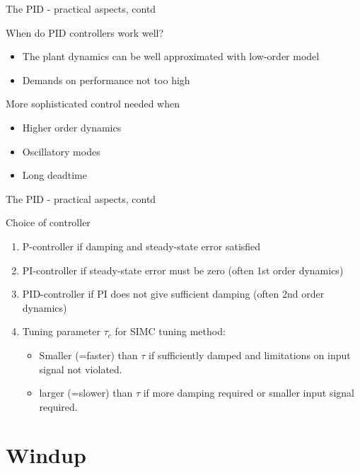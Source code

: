 \documentclass[presentation,aspectratio=169, usenames, dvipsnames]{beamer}
\begin{document}
\begin{frame}[label={sec:org348d7d8}]{The PID - practical aspects, contd}
\begin{block}{When do PID controllers work well?}
\begin{itemize}
\item The plant dynamics can be well approximated with low-order model
\item Demands on performance not too high
\end{itemize}
\end{block}
\begin{block}{More sophisticated control needed when}
\begin{itemize}
\item Higher order dynamics
\item Oscillatory modes
\item Long deadtime
\end{itemize}
\end{block}
\end{frame}

\begin{frame}[label={sec:org8734794}]{The PID - practical aspects, contd}
\begin{block}{Choice of controller}
\begin{enumerate}
\item P-controller if damping and steady-state error satisfied
\item PI-controller if steady-state error must be zero (often 1st order dynamics)
\item PID-controller if PI does not give sufficient damping (often 2nd order dynamics)
\item Tuning parameter \(\tau_c\) for SIMC tuning method: 
\begin{itemize}
\item Smaller (=faster) than \(\tau\) if sufficiently damped and limitations on input signal not violated.
\item larger (=slower) than \(\tau\) if more damping required or smaller input signal required.
\end{itemize}
\end{enumerate}
\end{block}
\end{frame}



\section{Windup}
\label{sec:orgcbf51b3}
\end{document}
